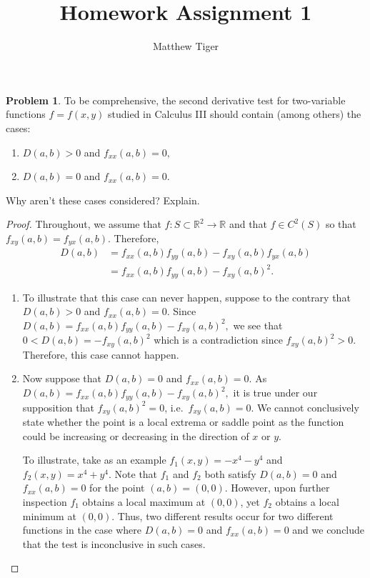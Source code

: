 \documentclass[12pt]{article}
\title{Homework Assignment 1}
\author{Matthew Tiger}
\theoremstyle{definition}
\newtheorem{problem}{Problem}
\begin{document}
\maketitle


\begin{problem}
  To be comprehensive, the second derivative test for two-variable functions $f = f(x, y)$
  studied in Calculus III should contain (among others) the cases:
  \begin{enumerate}
    \item $D(a, b) > 0$ and $f_{xx}(a, b) = 0,$
    \item $D(a, b) = 0$ and $f_{xx}(a, b) = 0.$
  \end{enumerate}
  Why aren't these cases considered? Explain.
\end{problem}

\begin{proof}
  Throughout, we assume that $f: S \subset \mathbb{R}^2 \to \mathbb{R}$ and that $f \in C^2(S)$ so
  that $f_{xy}(a,b) = f_{yx}(a,b)$. Therefore,
  \begin{align*}
    D(a, b)
    &= f_{xx}(a,b) f_{yy}(a,b) - f_{xy}(a,b)f_{yx}(a,b) \\
    &= f_{xx}(a,b) f_{yy}(a,b) - f_{xy}(a,b)^2.
  \end{align*}

  \begin{enumerate}
    \item To illustrate that this case can never happen, suppose to the contrary
      that $D(a, b) > 0$ and $f_{xx}(a, b) = 0.$ Since
      $D(a, b) = f_{xx}(a,b) f_{yy}(a,b) - f_{xy}(a,b)^2,$
      we see that $0 < D(a, b) = - f_{xy}(a,b)^2$ which is a contradiction since
      $f_{xy}(a,b)^2 > 0$. Therefore, this case cannot happen.
    \item Now suppose that $D(a, b) = 0$ and $f_{xx}(a, b) = 0$. As
      $D(a, b) = f_{xx}(a,b) f_{yy}(a,b) - f_{xy}(a,b)^2,$
      it is true under our supposition that $f_{xy}(a,b)^2 = 0$, i.e.\ $f_{xy}(a,b) = 0$.
      We cannot conclusively state whether the point is a local extrema or saddle point as the function could be increasing or decreasing in the direction of $x$ or $y$.

      To illustrate, take as an example $f_1(x, y) = -x^4 - y^4$ and $f_2(x, y) = x^4 + y^4$.
      Note that $f_1$ and $f_2$ both satisfy $D(a,b) = 0$ and $f_{xx}(a,b) = 0$ for the point $(a, b) = (0, 0)$.
      However, upon further inspection $f_1$ obtains a local maximum at $(0, 0)$, yet
      $f_2$ obtains a local minimum at $(0, 0)$. Thus, two different results occur for two different functions
      in the case where $D(a, b) = 0$ and $f_{xx}(a, b) = 0$ and we conclude that the
      test is inconclusive in such cases.

  \end{enumerate}
\end{proof}
\newpage
\end{document}
